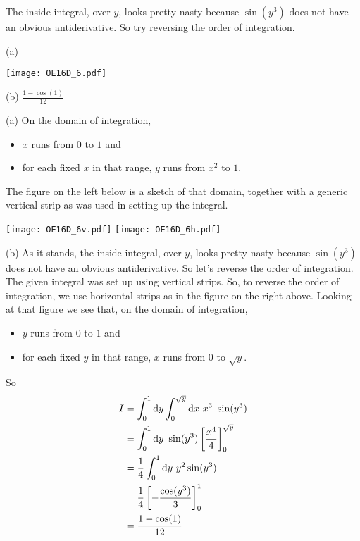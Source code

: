 \begin{hint}
The inside integral, over $y$, looks pretty nasty
because $\sin(y^3)$ does not have an obvious antiderivative. So try
reversing the order of integration.
\end{hint}

\begin{answer}
(a)
\begin{center}
     \texttt{[image: OE16D\_6.pdf]} 
\end{center}
(b) $\frac{1-\cos(1)}{12}$
\end{answer}

\begin{solution}
 (a) 
On the domain of integration,
\begin{itemize}
\item
$x$ runs from $0$ to $1$ and
\item 
for each fixed $x$ in that range, $y$ runs from $x^2$ to $1$.
\end{itemize}
The figure on the left below is a sketch of that domain, together with 
a generic vertical strip as was used in setting up the integral.

\begin{center}
     \texttt{[image: OE16D\_6v.pdf]} \qquad
     \texttt{[image: OE16D\_6h.pdf]} 
\end{center}

(b) As it stands, the inside integral, over $y$, looks pretty nasty
because $\sin(y^3)$ does not have an obvious antiderivative. So let's
reverse the order of integration. The given integral was set up 
using vertical strips. So, to reverse the order of integration, we use
horizontal strips as in the figure on the right above. Looking at that
figure we see that, on the domain of integration,
\begin{itemize}
\item
$y$ runs from $0$ to $1$ and
\item 
for each fixed $y$ in that range, $x$ runs from $0$ to $\sqrt{y}$.
\end{itemize}
So
\begin{align*}
I&=\int_0^1\mathrm{d}y \int_0^{\sqrt{y}}\mathrm{d}x\  x^3\ \sin(y^3) \\
 &=\int_0^1\mathrm{d}y\ \sin(y^3)\left[\frac{x^4}{4}\right]_0^{\sqrt{y}} \\
 &=\frac{1}{4}\int_0^1\mathrm{d}y\ y^2\sin(y^3) \\
 &=\frac{1}{4}\left[-\frac{\cos(y^3)}{3}\right]_0^1 \\
 &=\frac{1-\cos(1)}{12}
\end{align*}
\end{solution}

